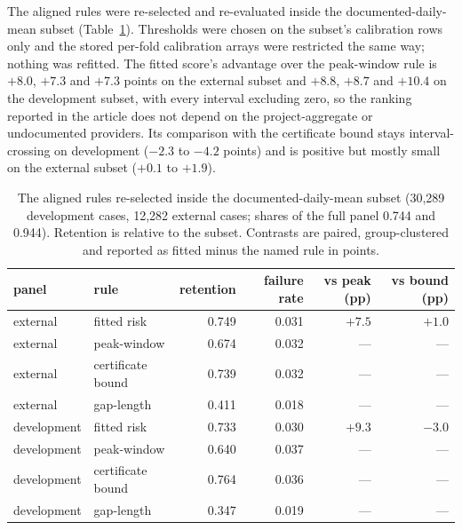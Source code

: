 \documentclass[draft]{agujournal2025}
\newcommand{\tabletext}{%
  \footnotesize
  \setlength{\baselineskip}{10pt}%
  \setlength{\parindent}{0pt}%
}
\begin{document}
The aligned rules were re-selected and re-evaluated inside the
documented-daily-mean subset (Table~\ref{tab:si-subset}). Thresholds were chosen
on the subset's calibration rows only and the stored per-fold calibration arrays
were restricted the same way; nothing was refitted. The fitted score's advantage
over the peak-window rule is $+8.0$, $+7.3$ and $+7.3$ points on the external
subset and $+8.8$, $+8.7$ and $+10.4$ on the development subset, with every
interval excluding zero, so the ranking reported in the article does not depend
on the project-aggregate or undocumented providers. Its comparison with the
certificate bound stays interval-crossing on development ($-2.3$ to $-4.2$
points) and is positive but mostly small on the external subset
($+0.1$ to $+1.9$).

\begin{table}
\caption{The aligned rules re-selected inside the documented-daily-mean subset
(30{,}289 development cases, 12{,}282 external cases; shares of the full panel
0.744 and 0.944). Retention is relative to the subset. Contrasts are paired,
group-clustered and reported as fitted minus the named rule in points.}
\label{tab:si-subset}
\tabletext
\centering
\begin{tabular}{llrrrr}
\hline
panel & rule & retention & failure rate & vs peak (pp) & vs bound (pp) \\
\hline
external & fitted risk & 0.749 & 0.031 & $+7.5$ & $+1.0$ \\
external & peak-window & 0.674 & 0.032 & --- & --- \\
external & certificate bound & 0.739 & 0.032 & --- & --- \\
external & gap-length & 0.411 & 0.018 & --- & --- \\
development & fitted risk & 0.733 & 0.030 & $+9.3$ & $-3.0$ \\
development & peak-window & 0.640 & 0.037 & --- & --- \\
development & certificate bound & 0.764 & 0.036 & --- & --- \\
development & gap-length & 0.347 & 0.019 & --- & --- \\
\hline
\end{tabular}
\end{table}
\end{document}
